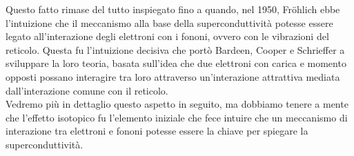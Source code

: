 Questo fatto rimase del tutto inspiegato fino a quando, nel 1950, Fröhlich ebbe l'intuizione che il meccanismo alla base della superconduttività potesse essere legato all'interazione degli elettroni con i fononi, ovvero con le vibrazioni del reticolo. Questa fu l'intuizione decisiva che portò Bardeen, Cooper e Schrieffer a sviluppare la loro teoria, basata sull'idea che due elettroni con carica e momento opposti possano interagire tra loro attraverso un'interazione attrattiva mediata dall'interazione comune con il reticolo.\\
Vedremo più in dettaglio questo aspetto in seguito, ma dobbiamo tenere a mente che l'effetto isotopico fu l'elemento iniziale che fece intuire che un meccanismo di interazione tra elettroni e fononi potesse essere la chiave per spiegare la superconduttività.
